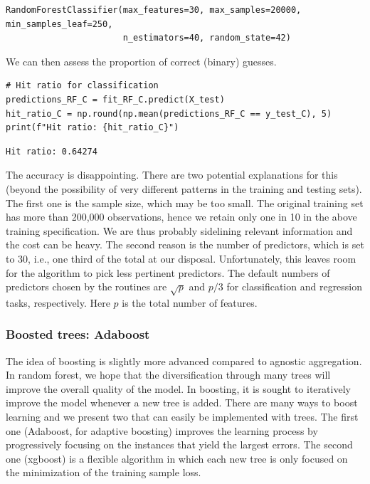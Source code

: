 \begin{verbatim}
RandomForestClassifier(max_features=30, max_samples=20000, min_samples_leaf=250,
                       n_estimators=40, random_state=42)
\end{verbatim}

We can then assess the proportion of correct (binary) guesses.

\begin{verbatim}
# Hit ratio for classification
predictions_RF_C = fit_RF_C.predict(X_test)
hit_ratio_C = np.round(np.mean(predictions_RF_C == y_test_C), 5)
print(f"Hit ratio: {hit_ratio_C}")
\end{verbatim}

\begin{verbatim}
Hit ratio: 0.64274
\end{verbatim}

The accuracy is disappointing. There are two potential explanations for this (beyond the possibility of very different patterns in the training and testing sets). The first one is the sample size, which may be too small. The original training set has more than 200,000 observations, hence we retain only one in 10 in the above training specification. We are thus probably sidelining relevant information and the cost can be heavy. The second reason is the number of predictors, which is set to 30, i.e., one third of the total at our disposal. Unfortunately, this leaves room for the algorithm to pick less pertinent predictors. The default numbers of predictors chosen by the routines are $\sqrt{p}$ and $p/3$ for classification and regression tasks, respectively. Here $p$ is the total number of features.

\subsubsection{Boosted trees: Adaboost}\label{sec_adaboost}

The idea of boosting is slightly more advanced compared to agnostic aggregation. In random forest, we hope that the diversification through many trees will improve the overall quality of the model. In boosting, it is sought to iteratively improve the model whenever a new tree is added. There are many ways to boost learning and we present two that can easily be implemented with trees. The first one (Adaboost, for adaptive boosting) improves the learning process by progressively focusing on the instances that yield the largest errors. The second one (xgboost) is a flexible algorithm in which each new tree is only focused on the minimization of the training sample loss.


